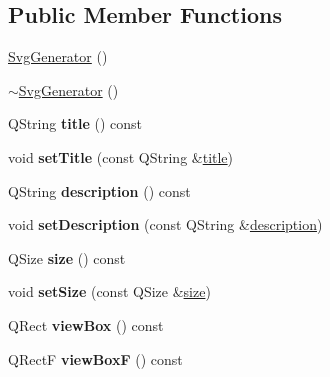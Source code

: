 \subsection*{Public Member Functions}
\begin{DoxyCompactItemize}
\item 
\hyperlink{class_svg_generator_a5e05e4c387fe37c16a70e8679f29ae35}{Svg\+Generator} ()
\item 
\hyperlink{class_svg_generator_a3692f9cf5bfad1ba4e34048ce92cef83}{$\sim$\+Svg\+Generator} ()
\item 
\mbox{\label{class_svg_generator_a403cbf7cc0ce2ca2f76ac2db3755087c}} 
Q\+String {\bfseries title} () const
\item 
\mbox{\label{class_svg_generator_acd9175fe2a5297b6fcd3a20735be2f6f}} 
void {\bfseries set\+Title} (const Q\+String \&\hyperlink{class_svg_generator_abe9c2cd9446061e16cfdea2fa7eb777d}{title})
\item 
\mbox{\label{class_svg_generator_ac533007f047b87fd0f216bcb7bdcb9f4}} 
Q\+String {\bfseries description} () const
\item 
\mbox{\label{class_svg_generator_a196d9f479ede256c8b2629a3210b2d5f}} 
void {\bfseries set\+Description} (const Q\+String \&\hyperlink{class_svg_generator_ad59f1e13a42ee64b2d354f29a5255cea}{description})
\item 
\mbox{\label{class_svg_generator_aec6aebf361c3cfeb113abc3aa7ea39ce}} 
Q\+Size {\bfseries size} () const
\item 
\mbox{\label{class_svg_generator_a117879acaf2da0a7948f37cfc8e77599}} 
void {\bfseries set\+Size} (const Q\+Size \&\hyperlink{class_svg_generator_acc6cf7b4596fb1c19ce95d45aac00124}{size})
\item 
\mbox{\label{class_svg_generator_a55ac9d065d2b5777023d625e10e4a287}} 
Q\+Rect {\bfseries view\+Box} () const
\item 
\mbox{\label{class_svg_generator_abf759a0d7a1c001d2c681ee84c9f35bf}} 
Q\+RectF {\bfseries view\+BoxF} () const
\item 

\end{DoxyCompactItemize}
